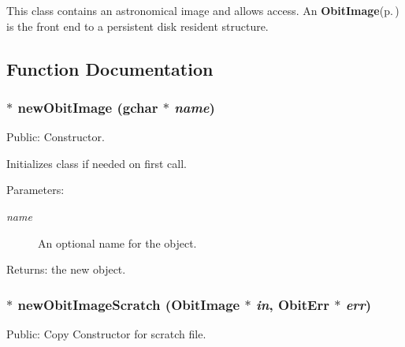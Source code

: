 This class contains an astronomical image and allows access. An {\bf Obit\-Image}{\rm (p.\,\pageref{structObitImage})} is the front end to a persistent disk resident structure.

\subsection{Function Documentation}
\subsubsection{$\ast$ new\-Obit\-Image (gchar $\ast$ {\em name})}\label{ObitImage_8c_a9}


Public: Constructor. 

Initializes class if needed on first call. \begin{Desc}
\item[Parameters:]
\begin{description}
\item[{\em name}]An optional name for the object. \end{description}
\end{Desc}
\begin{Desc}
\item[Returns:]the new object. \end{Desc}
\subsubsection{$\ast$ new\-Obit\-Image\-Scratch ({\bf Obit\-Image} $\ast$ {\em in}, {\bf Obit\-Err} $\ast$ {\em err})}\label{ObitImage_8c_a11}


Public: Copy Constructor for scratch file. 


